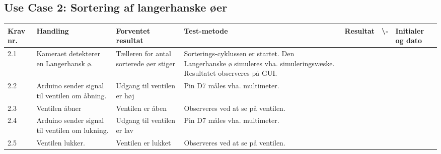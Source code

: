  \subsection{Use Case 2: Sortering af langerhanske øer}
\begin{center}
		\begin{longtable}{ | m{1.785cm} | m{1.785cm}| m{1.785cm}| m{1.785cm}| m{1.785cm}| m{1.785cm}|m{1.785cm}| } 
			\hline
			\textbf{Krav nr.} &\textbf{ Handling} & \textbf{Forventet resultat} & \textbf{Test-metode} &\textbf{Resultat} & \textbf{ \checkmark \textbackslash -} & \textbf{Initialer og dato} \\ 
			
			\hline
			2.1 &  Kameraet detekterer en Langerhansk ø. & Tælleren for antal sorterede øer stiger & Sorterings-cyklussen er startet. Den Langerhanske ø simuleres vha. simuleringsvæske. Resultatet observeres på GUI.  &  & & \\
			\hline
			
			\hline
			2.2 &  Arduino sender signal til ventilen om åbning. & Udgang til ventilen er høj & Pin D7 måles vha. multimeter. &  & & \\
			\hline
			
			2.3 &  Ventilen åbner  & Ventilen er åben & Observeres ved at se på ventilen.  &  & & \\
			\hline
			
			2.4 &  Arduino sender signal til ventilen om lukning.  & Udgang til ventilen er lav & Pin D7 måles vha. multimeter.  &  & & \\
			\hline
			
			2.5 &  Ventilen lukker. & Ventilen er lukket & Observeres ved at se på ventilen. &  & & \\
			\hline
			
			
		\end{longtable}
		
	\end{center}
	\pagebreak